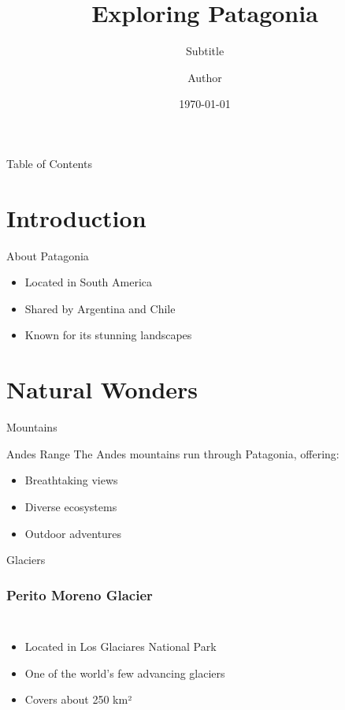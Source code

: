 \documentclass[t, aspectratio=169]{beamer}
\title{Exploring Patagonia}
\subtitle{Subtitle}
\author{Author}
\institute{Institute}
\date{\today}
\begin{document}
\begin{frame}
  \titlepage
\end{frame}

\begin{frame}{Table of Contents}
  \tableofcontents
\end{frame}

\section{Introduction}

\begin{frame}{About Patagonia}
  \begin{itemize}
    \item Located in South America
    \item Shared by Argentina and Chile
    \item Known for its stunning landscapes
  \end{itemize}
\end{frame}

\section{Natural Wonders}

\begin{frame}{Mountains}
  \begin{block}{Andes Range}
    The Andes mountains run through Patagonia, offering:
    \begin{itemize}
      \item Breathtaking views
      \item Diverse ecosystems
      \item Outdoor adventures
    \end{itemize}
  \end{block}
\end{frame}

\begin{frame}{Glaciers}
  \frametitle{Perito Moreno Glacier}
  \begin{columns}[c]
    \begin{itemize}
      \item Located in Los Glaciares National Park
      \item One of the world's few advancing glaciers
      \item Covers about 250 km²
    \end{itemize}
    
  \end{columns}
\end{frame}
\end{document}

